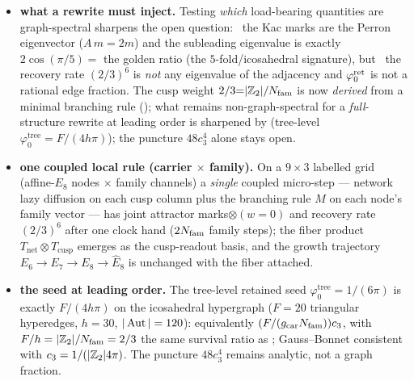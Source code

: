 \begin{itemize}[leftmargin=1.4em]
      $\rho(A_n)=2\cos\frac{\pi}{n+1}$ and $\rho(D_n)=2\cos\frac{\pi}{2n-2}$ are $<2$ for \emph{all} $n$, so
      neither family ever reaches $E_8$). So $P_2$ is exactly the irreducible seed on which the rule reaches
      $E_8$ as the last finite point --- a second network reading of the $(2,3,5)$ hull, not a derivation of
      $P_2$. \mO\ 
\item \textbf{what a rewrite must inject.} Testing \emph{which} load-bearing quantities are graph-spectral
      sharpens the open question: \mE\ the Kac marks are the Perron eigenvector ($A\,m{=}2m$) and the subleading
      eigenvalue is exactly $2\cos(\pi/5)=$ the golden ratio (the $5$-fold/icosahedral signature), but \mE\ the
      recovery rate $(2/3)^6$ is \emph{not} any eigenvalue of the adjacency and $\varphi_0^{\mathrm{ret}}$ is not a rational edge
      fraction. The cusp weight $2/3{=}|\mathbb{Z}_2|/N_{\mathrm{fam}}$ is now \emph{derived} from a minimal branching rule
      (); what remains non-graph-spectral for a \emph{full}-structure rewrite
      at leading order is sharpened by  (tree-level $\varphi_0^{\mathrm{tree}}=F/(4h\pi)$);
      the puncture $48c_3^4$ alone stays open. \mO\ 
\item \textbf{one coupled local rule (carrier $\times$ family).} On a $9\times3$ labelled grid (affine-$E_8$
      nodes $\times$ family channels) a \emph{single} coupled micro-step --- network lazy diffusion on each cusp
      column plus the  branching rule $M$ on each node's family vector --- has joint attractor
      marks$\otimes(w{=}0)$ and recovery rate $(2/3)^6$ after one clock hand ($2N_{\mathrm{fam}}$ family steps); the
       fiber product $T_{\mathrm{net}}\otimes T_{\mathrm{cusp}}$ emerges as the cusp-readout basis,
      and the  growth trajectory $E_6\!\to\!E_7\!\to\!E_8\!\to\!\hat E_8$ is unchanged with the
      fiber attached. \mE\ 
\item \textbf{the seed at leading order.} The tree-level retained seed
      $\varphi_0^{\mathrm{tree}}=1/(6\pi)$ is exactly $F/(4h\pi)$ on the icosahedral hypergraph
      ($F=20$ triangular hyperedges, $h=30$, $|\operatorname{Aut}|=120$): equivalently $(F/(g_{\mathrm{car}}N_{\mathrm{fam}}))c_3$, with
      $F/h=|\mathbb{Z}_2|/N_{\mathrm{fam}}=2/3$ the same survival ratio as ; Gauss--Bonnet
      consistent with $c_3=1/(|\mathbb{Z}_2|4\pi)$. The puncture $48c_3^4$ remains analytic, not a graph
      fraction. \mC\ 
\end{itemize}

